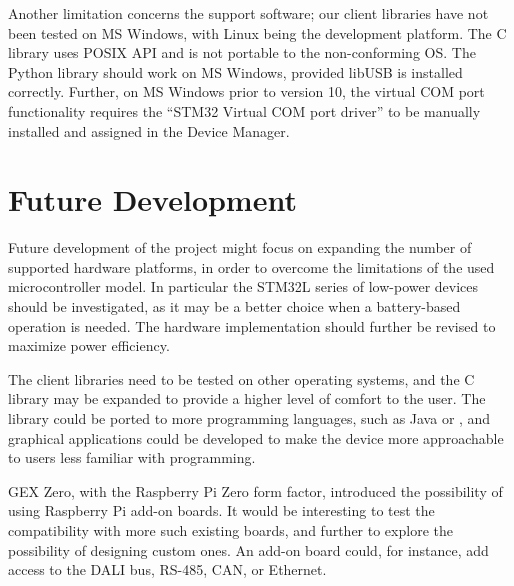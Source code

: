 Another limitation concerns the support software; our client libraries have not been tested on MS Windows, with Linux being the development platform. The C library uses POSIX \gls{API} and is not portable to the non-conforming \gls{OS}. The Python library should work on MS Windows, provided libUSB is installed correctly. Further, on MS Windows prior to version 10, the virtual COM port functionality requires the ``STM32 Virtual COM port driver'' to be manually installed and assigned in the Device Manager. 

\section{Future Development}

Future development of the project might focus on expanding the number of supported hardware platforms, in order to overcome the limitations of the used microcontroller model. In particular the STM32L series of low-power devices should be investigated, as it may be a better choice when a battery-based operation is needed. The hardware implementation should further be revised to maximize power efficiency.

The client libraries need to be tested on other operating systems, and the C library may be expanded to provide a higher level of comfort to the user. The library could be ported to more programming languages, such as Java or \CS, and graphical applications could be developed to make the device more approachable to users less familiar with programming.

GEX Zero, with the Raspberry Pi Zero form factor, introduced the possibility of using Raspberry Pi add-on boards. It would be interesting to test the compatibility with more such existing boards, and further to explore the possibility of designing custom ones. An add-on board could, for instance, add access to the \gls{DALI} bus, RS-485, \gls{CAN}, or Ethernet.





